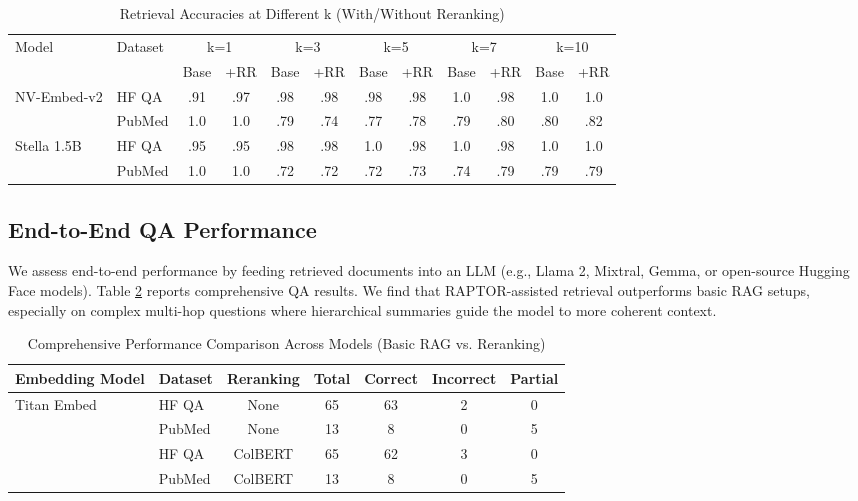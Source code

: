 \documentclass{scrartcl}
\begin{document}
\begin{table}[h]
    \centering
    \caption{Retrieval Accuracies at Different k (With/Without Reranking)}
    \small
    \begin{tabular}{ll|cc|cc|cc|cc|cc}
    \hline
    \multirow{2}{*}{Model} & \multirow{2}{*}{Dataset} & \multicolumn{2}{c|}{k=1} & \multicolumn{2}{c|}{k=3} & \multicolumn{2}{c|}{k=5} & \multicolumn{2}{c|}{k=7} & \multicolumn{2}{c}{k=10} \\
    & & Base & +RR & Base & +RR & Base & +RR & Base & +RR & Base & +RR \\
    \hline
    NV-Embed-v2 & HF QA & .91 & .97 & .98 & .98 & .98 & .98 & 1.0 & .98 & 1.0 & 1.0 \\
    & PubMed & 1.0 & 1.0 & .79 & .74 & .77 & .78 & .79 & .80 & .80 & .82 \\
    \hline
    Stella 1.5B & HF QA & .95 & .95 & .98 & .98 & 1.0 & .98 & 1.0 & .98 & 1.0 & 1.0 \\
    & PubMed & 1.0 & 1.0 & .72 & .72 & .72 & .73 & .74 & .79 & .79 & .79 \\
    \hline
    \end{tabular}
    \label{tab:retrieval_accuracies}
\end{table}

\subsection{End-to-End QA Performance}

We assess end-to-end performance by feeding retrieved documents into an LLM (e.g., Llama 2, Mixtral, Gemma, or open-source Hugging Face models). Table \ref{tab:comprehensive_results} reports comprehensive QA results. We find that RAPTOR-assisted retrieval outperforms basic RAG setups, especially on complex multi-hop questions where hierarchical summaries guide the model to more coherent context.

\begin{table}[h]
    \centering
    \caption{Comprehensive Performance Comparison Across Models (Basic RAG vs. Reranking)}
    \small
    \begin{tabular}{llccccc}
    \hline
    Embedding Model & Dataset & Reranking & Total & Correct & Incorrect & Partial \\
    \hline
    Titan Embed & HF QA & None & 65 & 63 & 2 & 0 \\
    & PubMed & None & 13 & 8 & 0 & 5 \\
    & HF QA & ColBERT & 65 & 62 & 3 & 0 \\
    & PubMed & ColBERT & 13 & 8 & 0 & 5 \\
    \hline
    \end{tabular}
    \label{tab:comprehensive_results}
\end{table}
\end{document}
